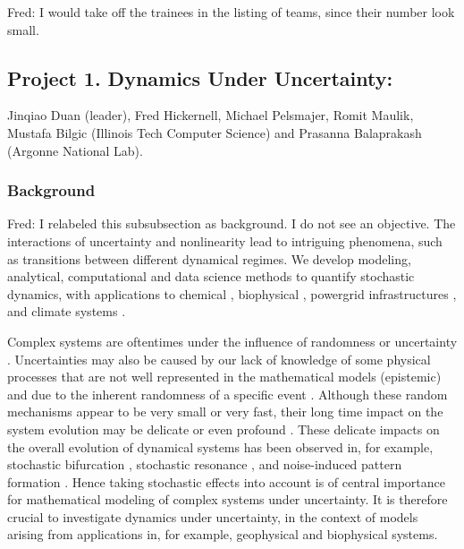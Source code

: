 \documentclass[11pt]{NSFamsart}
\newcommand{\FredNote}[1]{{\color{blue} Fred: #1}}
\begin{document}
\FredNote{I would take off the trainees in the listing of teams, since their number look small.}

\iffalse  
 While there   may be thematic driven differences on the approach to deliver
knowledge and do research, each group share a similar year-round schedule that will allow awareness
and exchange of ideas throughout the academic year, mainly at the RTG graduate seminar.   Finally each summer program is centered on
an intense 2-week period. \FredNote{What does this mean?} Participating undergraduates will have a unique opportunity to work in a serious
way on two topics, which we believe to be highly beneficial.
\fi
 

\subsection*{Project 1. Dynamics  Under Uncertainty:} 
Jinqiao Duan (leader), Fred Hickernell, Michael Pelsmajer, Romit Maulik, Mustafa Bilgic (Illinois Tech Computer Science) and Prasanna Balaprakash (Argonne National Lab). 

\subsubsection*{Background} \phantom{} \FredNote{I relabeled this subsubsection as background.  I do not see an objective.} The interactions of uncertainty and nonlinearity lead to intriguing phenomena, such as  transitions   between  different dynamical regimes. We develop modeling, analytical, computational and data science  methods to quantify     stochastic dynamics, with applications to chemical \cite{agaoglou_chemical_2019}, biophysical \cite{Ruoff2018BiologicalCR}, powergrid infrastructures \cite{MEDJROUBI201714}, and climate systems \cite{Alexandrov2020NonlinearCD, Franzke2017NonlinearAS, Wan2020ADF}. 
 
Complex systems are oftentimes under the influence  of randomness or uncertainty \cite{Moss1, Horst, Gar, VanKampen3}. Uncertainties may also be caused by our lack of knowledge of some physical processes that are not well represented in the mathematical models (epistemic) and due to the inherent randomness of a specific event  \cite{Palmer1, Kantz, Wilks, Williams}.
Although these random mechanisms appear to be very small or very fast, their long time impact on the system evolution may be delicate or even profound \cite{Arnold, DuanBook2015}. These delicate impacts on the overall evolution of dynamical systems has been observed in, for example, stochastic bifurcation
\cite{Crauel, CarLanRob01, Horst}, stochastic resonance \cite{imkeller2002model},
 and  noise-induced pattern formation \cite{Gar, blomker2003pattern}.
Hence taking stochastic effects   into account is of
central importance for mathematical modeling of
complex systems under uncertainty.   It is therefore crucial to investigate dynamics under uncertainty, in the context of models arising from applications in, for example, geophysical and biophysical systems. 
\end{document}
